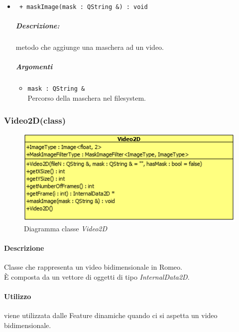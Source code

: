 \begin{itemize}
		\item \color{blue}\verb! + maskImage(mask : QString &) : void !\\
		\color{black}
		\subparagraph{Descrizione:} metodo che aggiunge una maschera ad un video.
		\subparagraph{Argomenti}
				\begin{itemize}
					\item \color{RoyalPurple}\verb!mask : QString & !\\
					\color{black}Percorso della maschera nel filesystem.
				\end{itemize}
		
	\end{itemize}
	
\pagebreak
\subsubsection{Video2D(class)}
\label{Video2D}
\begin{figure}[!h]
\centering
			\includegraphics[scale=1]{./Content/Immagini/modelCore/Video2D.png}
			\caption{Diagramma classe \textsl{Video2D}}
			\label{Video2D_img}
\end{figure}

\paragraph{Descrizione \\}
Classe che rappresenta un video bidimensionale in Romeo\g{}.
\\È composta da un vettore di oggetti di tipo \textsl{InternalData2D}.

\paragraph{Utilizzo \\}
viene utilizzata dalle Feature\g{} dinamiche quando ci si aspetta un video bidimensionale.

